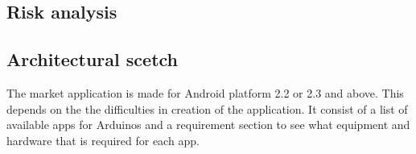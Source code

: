 \subsection{Risk analysis}

\subsection{Architectural scetch}
The market application is made for Android platform 2.2 or 2.3 and above. This depends on the the difficulties in creation of the application. It consist of a list of available apps for Arduinos and a requirement section to see what equipment and hardware that is required for each app.